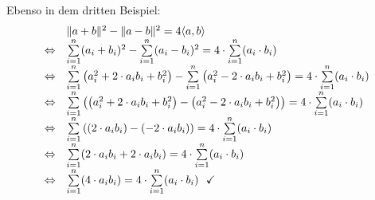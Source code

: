 Ebenso in dem dritten Beispiel:
\begin{equation*}
  \begin{array}{ c l }
    & \| a+b\| ^{2} -\| a-b\| ^{2} =4\langle a,b\rangle \\
    \Leftrightarrow  & \sum\limits _{i=1}^{n}( a_{i} +b_{i})^{2} -\sum\limits _{i=1}^{n}( a_{i} -b_{i})^{2} =4\cdot \sum\limits _{i=1}^{n}( a_{i} \cdot b_{i})\\
    \Leftrightarrow  & \sum\limits _{i=1}^{n}\left( a_{i}^{2} +2\cdot a_{i} b_{i} +b_{i}^{2}\right) -\sum\limits _{i=1}^{n}\left( a_{i}^{2} -2\cdot a_{i} b_{i} +b_{i}^{2}\right) =4\cdot \sum\limits _{i=1}^{n}( a_{i} \cdot b_{i})\\
    \Leftrightarrow  & \sum\limits _{i=1}^{n}\left(\left( a_{i}^{2} +2\cdot a_{i} b_{i} +b_{i}^{2}\right) -\left( a_{i}^{2} -2\cdot a_{i} b_{i} +b_{i}^{2}\right)\right) =4\cdot \sum\limits _{i=1}^{n}( a_{i} \cdot b_{i})\\
    \Leftrightarrow  & \sum\limits _{i=1}^{n}\left(( 2\cdot a_{i} b_{i}) -( -2\cdot a_{i} b_{i})\right) =4\cdot \sum\limits _{i=1}^{n}( a_{i} \cdot b_{i})\\
    \Leftrightarrow  & \sum\limits _{i=1}^{n}( 2\cdot a_{i} b_{i} +2\cdot a_{i} b_{i}) =4\cdot \sum\limits _{i=1}^{n}( a_{i} \cdot b_{i})\\
    \Leftrightarrow  & \sum\limits _{i=1}^{n}( 4\cdot a_{i} b_{i}) =4\cdot \sum\limits _{i=1}^{n}( a_{i} \cdot b_{i}) \ \ \checkmark 
  \end{array}
\end{equation*}
